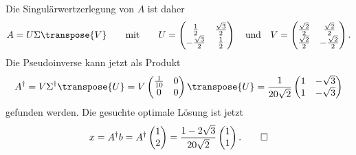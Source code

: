 \begin{loesung}
Die Singulärwertzerlegung von $A$ ist daher
\[
A
=
U\Sigma \transpose{V}
\qquad\text{mit}\qquad
U
=
\begin{pmatrix}
\frac{1}{2}         & \frac{\sqrt{3}}{2} \\
-\frac{\sqrt{3}}{2} & \frac{1}{2}       
\end{pmatrix}
\quad \text{und}\quad
V
=
\begin{pmatrix}
\frac{\sqrt{2}}2 & \frac{\sqrt{2}}2 \\
\frac{\sqrt{2}}2 &-\frac{\sqrt{2}}2
\end{pmatrix}.
\]
Die Pseudoinverse kann jetzt als Produkt
\[
A^\dagger
=
V\Sigma^\dagger \transpose{U}
=
V\begin{pmatrix}
\frac{1}{10} & 0 \\
      0      & 0
\end{pmatrix} \transpose{U}
=
\frac{1}{20\sqrt{2}}
\begin{pmatrix}
1&-\sqrt{3}\\
1&-\sqrt{3}
\end{pmatrix}
\]
gefunden werden.
Die gesuchte optimale Lösung  ist jetzt
\[
x
=
A^\dagger b
=
A^\dagger \begin{pmatrix}1\\2\end{pmatrix}
=
\frac{1-2\sqrt{3}}{20\sqrt{2}}
\begin{pmatrix}
1\\1
\end{pmatrix}.
\qedhere
\]
\end{loesung}

